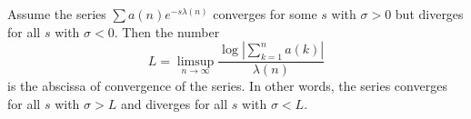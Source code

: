 Assume the series $\sum a(n)e^{-s\lambda(n)}$ converges for some $s$ with $\sigma > 0$ but diverges for all $s$ with $\sigma < 0$. Then the number
$$L = \limsup_{n \to \infty} \frac{\log\left|\sum_{k=1}^{n} a(k)\right|}{\lambda(n)}$$
is the abscissa of convergence of the series. In other words, the series converges for all $s$ with $\sigma > L$ and diverges for all $s$ with $\sigma < L$.
